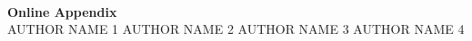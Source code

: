 \newpage
\singlespacing 

%

\onehalfspacing


%
%


\clearpage  
\appendix

\renewcommand\thefigure{\thesection.\arabic{figure}}
\setcounter{figure}{0}

\renewcommand\thetable{\thesection.\arabic{table}}
\setcounter{table}{0}


\clearpage
\begin{center}
\medskip \\
	\Large \textbf{Online Appendix} \bigskip \\
\large AUTHOR NAME 1 \hspace{0.3cm} AUTHOR NAME 2 \hspace{0.3cm} AUTHOR NAME 3 \hspace{0.3cm} AUTHOR NAME 4 \bigskip
	
\end{center}


%

%

%





